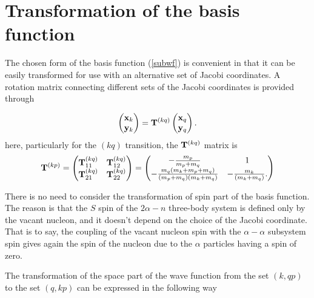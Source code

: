 \documentclass[
12pt, %
oneside, %
english, %
onehalfspacing, %
onehalfspacing, %
headsepline, %
]{MastersDoctoralThesis} %
\begin{document}
 \section{Transformation of the basis function }
 The chosen form of the basis function (\ref{subwf}) is convenient in that it can be easily transformed for use with an alternative set of Jacobi coordinates. A rotation matrix connecting different sets of the Jacobi coordinates is provided through
 
\begin{equation}
\begin{pmatrix}
{\bf x}_k \\ 
{\bf y}_k
\end{pmatrix}  = {\bf T}^{(kq)}
\begin{pmatrix}
{\bf x}_q \\ 
{\bf y}_q
\end{pmatrix}.
\end{equation}
here, particularly for  the $(kq)$ transition, the ${\bf T}^{(kq)}$ matrix is 
\begin{equation}
{\bf T}^{(kp)} = 
 \begin{pmatrix}
 {\bf T}^{(kq)}_{11} & {\bf T}^{(kq)}_{12} \\
 {\bf T}^{(kq)}_{21}  &  {\bf T}^{(kq)}_{22}
 \end{pmatrix}
=
 \begin{pmatrix}
 -\tfrac{m_p}{m_p+m_q} & 1 \\
 -\tfrac{m_q(m_k+m_p+m_q)}{(m_p+m_q)(m_k+m_q)}  &  -\tfrac{m_k}{(m_k+m_q)}.
 \end{pmatrix}
\end{equation}

There is no need to consider the transformation of spin part of the basis function. The reason is that the $S$ spin of the $2\alpha-n$ three-body system is defined only by the vacant nucleon, and it doesn't depend on the choice of the Jacobi coordinate. That is to say, the coupling of the vacant nucleon spin with the $\alpha-\alpha$ subsystem spin gives again the spin of the nucleon due to the $\alpha$ particles having a spin of zero.  

The transformation of the space part of the wave function from the set $ \left(k, qp \right) $ to the set $ \left(q, kp \right) $ can be expressed in the following way
\end{document}
